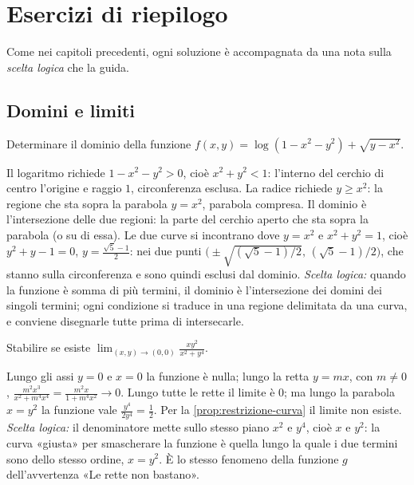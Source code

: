 \section{Esercizi di riepilogo}
\label{sec:esercizi-cap7}

Come nei capitoli precedenti, ogni soluzione è accompagnata da una nota sulla
\emph{scelta logica} che la guida.

\subsection*{Domini e limiti}

\begin{esercizio}
Determinare il dominio della funzione $f(x,y)=\log(1-x^{2}-y^{2})+\sqrt{y-x^{2}}$.
\begin{soluzione}
Il logaritmo richiede $1-x^{2}-y^{2}>0$, cioè $x^{2}+y^{2}<1$: l'interno del cerchio di
centro l'origine e raggio $1$, circonferenza esclusa. La radice richiede $y\ge x^{2}$: la
regione che sta sopra la parabola $y=x^{2}$, parabola compresa. Il dominio è
l'intersezione delle due regioni: la parte del cerchio aperto che sta sopra la parabola
(o su di essa). Le due curve si incontrano dove $y=x^{2}$ e $x^{2}+y^{2}=1$, cioè
$y^{2}+y-1=0$, $y=\frac{\sqrt5-1}2$: nei due punti
$\bigl(\pm\sqrt{(\sqrt5-1)/2},\,(\sqrt5-1)/2\bigr)$, che stanno sulla circonferenza e sono
quindi esclusi dal dominio.
\emph{Scelta logica:} quando la funzione è somma di più termini, il dominio è
l'intersezione dei
domini dei singoli termini; ogni condizione si traduce in una regione delimitata da una
curva, e conviene disegnarle tutte prima di intersecarle.
\end{soluzione}
\end{esercizio}

\begin{esercizio}\label{es:limite-xy2}
Stabilire se esiste $\displaystyle\lim_{(x,y)\to(0,0)}\frac{xy^{2}}{x^{2}+y^{4}}$.
\begin{soluzione}
Lungo gli assi $y=0$ e $x=0$ la funzione è nulla; lungo la retta $y=mx$, con $m\neq0$,
$\frac{m^{2}x^{3}}{x^{2}+m^{4}x^{4}}=\frac{m^{2}x}{1+m^{4}x^{2}}\to0$. Lungo tutte le rette il limite
è $0$; ma lungo la parabola $x=y^{2}$ la funzione vale $\frac{y^{4}}{2y^{4}}=\frac12$. Per la
\cref{prop:restrizione-curva} il limite non esiste. \emph{Scelta logica:} il denominatore
mette sullo stesso piano $x^{2}$ e $y^{4}$, cioè $x$ e $y^{2}$: la curva «giusta» per
smascherare la funzione è quella lungo la quale i due termini sono dello stesso ordine,
$x=y^{2}$. È lo stesso fenomeno della funzione $g$ dell'avvertenza «Le rette non bastano».
\end{soluzione}
\end{esercizio}

